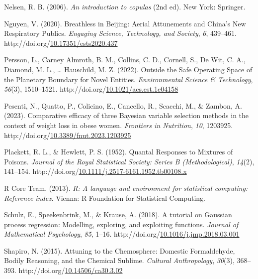 \documentclass[12pt, twoside]{amherstthesis}
\newenvironment{CSLReferences}[2]%
  {}%
  {\par}
\begin{document}
\begin{CSLReferences}{1}{0}
\leavevmode{}%
Nelsen, R. B. (2006). \emph{An introduction to copulas} (2nd ed). New York: Springer.

\leavevmode{}%
Nguyen, V. (2020). Breathless in {Beijing}: {Aerial} {Attunements} and {China}'s {New} {Respiratory} {Publics}. \emph{Engaging Science, Technology, and Society}, \emph{6}, 439--461. http://doi.org/\href{https://doi.org/10.17351/ests2020.437}{10.17351/ests2020.437}

\leavevmode{}%
Persson, L., Carney Almroth, B. M., Collins, C. D., Cornell, S., De Wit, C. A., Diamond, M. L., \ldots{} Hauschild, M. Z. (2022). Outside the {Safe} {Operating} {Space} of the {Planetary} {Boundary} for {Novel} {Entities}. \emph{Environmental Science \& Technology}, \emph{56}(3), 1510--1521. http://doi.org/\href{https://doi.org/10.1021/acs.est.1c04158}{10.1021/acs.est.1c04158}

\leavevmode{}%
Pesenti, N., Quatto, P., Colicino, E., Cancello, R., Scacchi, M., \& Zambon, A. (2023). Comparative efficacy of three {Bayesian} variable selection methods in the context of weight loss in obese women. \emph{Frontiers in Nutrition}, \emph{10}, 1203925. http://doi.org/\href{https://doi.org/10.3389/fnut.2023.1203925}{10.3389/fnut.2023.1203925}

\leavevmode{}%
Plackett, R. L., \& Hewlett, P. S. (1952). Quantal {Responses} to {Mixtures} of {Poisons}. \emph{Journal of the Royal Statistical Society: Series B (Methodological)}, \emph{14}(2), 141--154. http://doi.org/\href{https://doi.org/10.1111/j.2517-6161.1952.tb00108.x}{10.1111/j.2517-6161.1952.tb00108.x}

\leavevmode{}%
R Core Team. (2013). \emph{R: A language and environment for statistical computing: Reference index}. Vienna: R Foundation for Statistical Computing.

\leavevmode{}%
Schulz, E., Speekenbrink, M., \& Krause, A. (2018). A tutorial on {Gaussian} process regression: {Modelling}, exploring, and exploiting functions. \emph{Journal of Mathematical Psychology}, \emph{85}, 1--16. http://doi.org/\href{https://doi.org/10.1016/j.jmp.2018.03.001}{10.1016/j.jmp.2018.03.001}

\leavevmode{}%
Shapiro, N. (2015). Attuning to the {Chemosphere}: {Domestic} {Formaldehyde}, {Bodily} {Reasoning}, and the {Chemical} {Sublime}. \emph{Cultural Anthropology}, \emph{30}(3), 368--393. http://doi.org/\href{https://doi.org/10.14506/ca30.3.02}{10.14506/ca30.3.02}


\end{CSLReferences}
\end{document}
